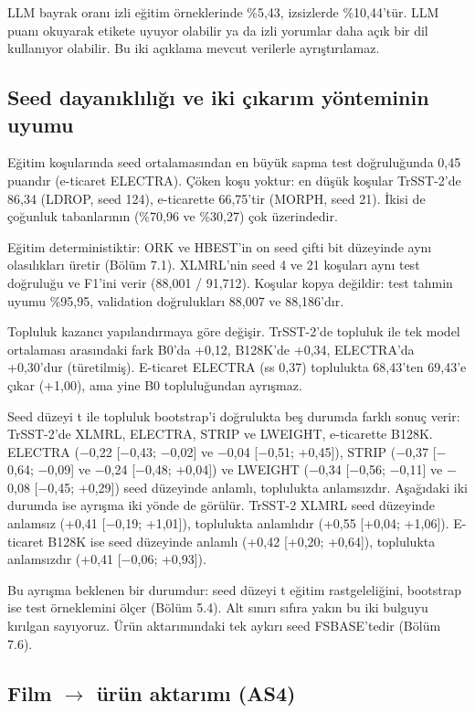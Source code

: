 \documentclass[11pt]{article}
\begin{document}
LLM bayrak oranı izli eğitim örneklerinde \%5,43, izsizlerde \%10,44'tür. LLM puanı okuyarak etikete uyuyor olabilir ya da izli yorumlar daha açık bir dil kullanıyor olabilir. Bu iki açıklama mevcut verilerle ayrıştırılamaz.

\subsection{Seed dayanıklılığı ve iki çıkarım yönteminin uyumu}

Eğitim koşularında seed ortalamasından en büyük sapma test doğruluğunda 0,45 puandır (e-ticaret ELECTRA). Çöken koşu yoktur: en düşük koşular TrSST-2'de 86,34 (LDROP, seed 124), e-ticarette 66,75'tir (MORPH, seed 21). İkisi de çoğunluk tabanlarının (\%70,96 ve \%30,27) çok üzerindedir.

Eğitim deterministiktir: ORK ve HBEST'in on seed çifti bit düzeyinde aynı olasılıkları üretir (Bölüm 7.1). XLMRL'nin seed 4 ve 21 koşuları aynı test doğruluğu ve F1'ini verir (88,001 / 91,712). Koşular kopya değildir: test tahmin uyumu \%95,95, validation doğrulukları 88,007 ve 88,186'dır.

Topluluk kazancı yapılandırmaya göre değişir. TrSST-2'de topluluk ile tek model ortalaması arasındaki fark B0'da +0,12, B128K'de +0,34, ELECTRA'da +0,30'dur (türetilmiş). E-ticaret ELECTRA (ss 0,37) toplulukta 68,43'ten 69,43'e çıkar (+1,00), ama yine B0 topluluğundan ayrışmaz.

Seed düzeyi t ile topluluk bootstrap'i doğrulukta beş durumda farklı sonuç verir: TrSST-2'de XLMRL, ELECTRA, STRIP ve LWEIGHT, e-ticarette B128K. ELECTRA ($-$0,22 [$-$0,43; $-$0,02] ve $-$0,04 [$-$0,51; +0,45]), STRIP ($-$0,37 [$-$0,64; $-$0,09] ve $-$0,24 [$-$0,48; +0,04]) ve LWEIGHT ($-$0,34 [$-$0,56; $-$0,11] ve $-$0,08 [$-$0,45; +0,29]) seed düzeyinde anlamlı, toplulukta anlamsızdır. Aşağıdaki iki durumda ise ayrışma iki yönde de görülür. TrSST-2 XLMRL seed düzeyinde anlamsız (+0,41 [$-$0,19; +1,01]), toplulukta anlamlıdır (+0,55 [+0,04; +1,06]). E-ticaret B128K ise seed düzeyinde anlamlı (+0,42 [+0,20; +0,64]), toplulukta anlamsızdır (+0,41 [$-$0,06; +0,93]).

Bu ayrışma beklenen bir durumdur: seed düzeyi t eğitim rastgeleliğini, bootstrap ise test örneklemini ölçer (Bölüm 5.4). Alt sınırı sıfıra yakın bu iki bulguyu kırılgan sayıyoruz. Ürün aktarımındaki tek aykırı seed FSBASE'tedir (Bölüm 7.6).

\subsection{Film \texorpdfstring{$\rightarrow$}{→} ürün aktarımı (AS4)}
\end{document}
